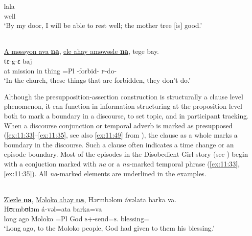       \medskip
\gll lala\\
     well\\
\glt  ‘By my door, I will be able to rest well; the mother tree [is] good.’
\z

\ea \label{ex:11:32}
\\
\underline{A  məsəyon  ava  \textbf{na}},  \underline{ele  ahay  aməwəsle  \textbf{na}},  tege  bay.  \\
\gll  {}                      tɛ-g-ɛ    baj  \\
      at  mission  in  {\PSP}  thing  =Pl  {\DEP}-forbid-{\CL}  {\PSP}  \textsc{p}-do-{\CL}  {\NEG}\\
\glt  ‘In the church, these things that are forbidden, they don’t do.’
\z

Although the presupposition-assertion construction is structurally a clause level phenomenon, it can function in information structuring at the proposition level both to mark a boundary in a discourse, to set topic, and in participant tracking. When a discourse conjunction or temporal adverb is marked as presupposed (\ref{ex:11:33}--\ref{ex:11:35}, see also \ref{ex:11:49} from ), the clause as a whole marks a boundary in the discourse. Such a clause often indicates a time change or an episode boundary. Most of the episodes in the Disobedient Girl story (see ) begin with a conjuction marked with \textit{na}  or a \textit{na}-marked temporal phrase (\ref{ex:11:33}, \ref{ex:11:35}).  All \textit{na}-marked elements are underlined in the examples. 

\ea \label{ex:11:33}
\\
\underline{Zlezle  \textbf{na}}, \underline{Məloko  ahay  \textbf{na}},  Hərmbəlom  ávəlata  barka  va.  \\
\gll  {}         Hʊrmbʊlɔm    á-vəl=ata             barka=va  \\
      {long ago}  {\PSP}  Moloko      =Pl   {\PSP}  God    \textsc{s}+{\IFV}-send=\textsc{s}.{\IO}  blessing={\PRF}\\ 
\glt  ‘Long ago, to the Moloko people, God had given to them his blessing.’
\z

